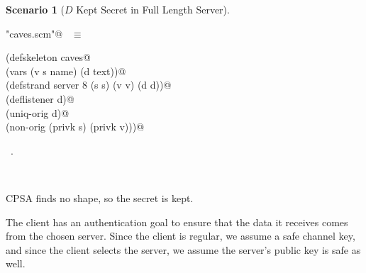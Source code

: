 \documentclass[titlepage,12pt]{article}
\theoremstyle{definition}
\newtheorem{scenario}{Scenario}
\begin{document}
\begin{scenario}[$D$ Kept Secret in Full Length Server]
\label{scene:d kept secret in server}
\begin{flushleft} \small
\begin{minipage}{\linewidth} \label{scrap31}
\verb@"caves.scm"@\nobreak\ {\footnotesize {} }$\equiv$
\vspace{-1ex}
\begin{list}{}{} \item
\mbox{}\verb@(defskeleton caves@\\
\mbox{}\verb@  (vars (v s name) (d text))@\\
\mbox{}\verb@  (defstrand server 8 (s s) (v v) (d d))@\\
\mbox{}\verb@  (deflistener d)@\\
\mbox{}\verb@  (uniq-orig d)@\\
\mbox{}\verb@  (non-orig (privk s) (privk v)))@{\NWsep}
\end{list}
\vspace{-1ex}
\footnotesize\addtolength{\baselineskip}{-1ex}
\begin{list}{}{\setlength{\itemsep}{-\parsep}\setlength{\itemindent}{-\leftmargin}}
\item \NWtxtFileDefBy\ .
\end{list}
\end{minipage}\\[4ex]
\end{flushleft}
\end{scenario}

CPSA finds no shape, so the secret is kept.

The client has an authentication goal to ensure that the
data it receives comes from the chosen server.
Since the client is regular, we assume a safe channel key,
and since the client selects the server, we assume the
server's public key is safe as well.
\end{document}

